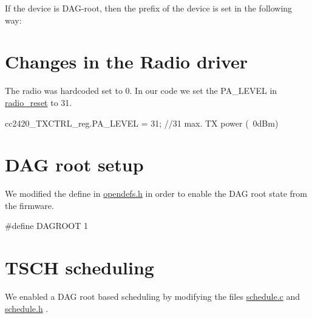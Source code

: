  If the device is D\+A\+G-\/root, then the prefix of the device is set in the following way\+: 
\begin{DoxyCodeInclude}
\end{DoxyCodeInclude}
 

 \hypertarget{_l_k_n_contribution_Radio_edits}{}\section{Changes in the Radio driver}\label{_l_k_n_contribution_Radio_edits}
The radio was hardcoded set to 0. In our code we set the P\+A\+\_\+\+L\+E\+V\+EL in \hyperlink{group__radio_gaf181029cf06b94f0f4ceaafec1c3f209}{radio\+\_\+reset} to 31. 
\begin{DoxyCodeInclude}
   cc2420\_TXCTRL\_reg.PA\_LEVEL               = 31; \textcolor{comment}{//31 max. TX power (~0dBm)}
\end{DoxyCodeInclude}
 

 \hypertarget{_l_k_n_contribution_DAG_root}{}\section{D\+A\+G root setup}\label{_l_k_n_contribution_DAG_root}
We modified the define in \hyperlink{opendefs_8h}{opendefs.\+h} in order to enable the D\+AG root state from the firmware. 
\begin{DoxyCodeInclude}
\textcolor{preprocessor}{#define DAGROOT 1}
\end{DoxyCodeInclude}
 

 \hypertarget{_l_k_n_contribution_TSCH_scheduling}{}\section{T\+S\+C\+H scheduling}\label{_l_k_n_contribution_TSCH_scheduling}
We enabled a D\+AG root based scheduling by modifying the files \hyperlink{schedule_8c}{schedule.\+c} and \hyperlink{schedule_8h}{schedule.\+h} .


